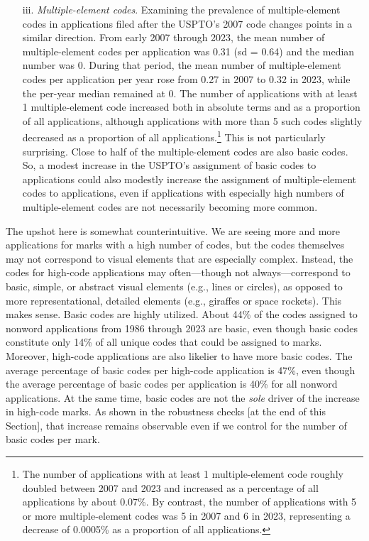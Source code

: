 \documentclass[letterpaper, 11pt, oneside]{article}
\begin{document}
\begin{enumerate}
\item[iii.] \textit{Multiple-element codes}. Examining the prevalence of multiple-element codes in applications filed after the USPTO's 2007 code changes points in a similar direction. From early 2007 through 2023, the mean number of multiple-element codes per application was 0.31 (sd = 0.64) and the median number was 0. During that period, the mean number of multiple-element codes per application per year rose from 0.27 in 2007 to 0.32 in 2023, while the per-year median remained at 0. The number of applications with at least 1 multiple-element code increased both in absolute terms and as a proportion of all applications, although applications with more than 5 such codes slightly decreased as a proportion of all applications.\footnote{The number of applications with at least 1 multiple-element code roughly doubled between 2007 and 2023 and increased as a percentage of all applications by about 0.07\%. By contrast, the number of applications with 5 or more multiple-element codes was 5 in 2007 and 6 in 2023, representing a decrease of 0.0005\% as a proportion of all applications.} This is not particularly surprising. Close to half of the multiple-element codes are also basic codes. So, a modest increase in the USPTO's assignment of basic codes to applications could also modestly increase the assignment of multiple-element codes to applications, even if applications with especially high numbers of multiple-element codes are not necessarily becoming more common.

\end{enumerate}

The upshot here is somewhat counterintuitive. We are seeing more and more applications for marks with a high number of codes, but the codes themselves may not correspond to visual elements that are especially complex. Instead, the codes for high-code applications may often—though not always—correspond to basic, simple, or abstract visual elements (e.g., lines or circles), as opposed to more representational, detailed elements (e.g., giraffes or space rockets). This makes sense. Basic codes are highly utilized. About 44\% of the codes assigned to nonword applications from 1986 through 2023 are basic, even though basic codes constitute only 14\% of all unique codes that could be assigned to marks. Moreover, high-code applications are also likelier to have more basic codes. The average percentage of basic codes per high-code application is 47\%, even though the average percentage of basic codes per application is 40\% for all nonword applications. At the same time, basic codes are not the \emph{sole} driver of the increase in high-code marks. As shown in the robustness checks [at the end of this Section], that increase remains observable even if we control for the number of basic codes per mark.
\end{document}
